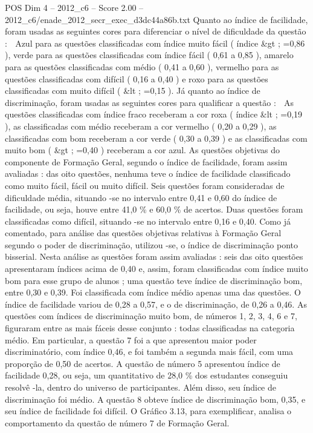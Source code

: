 \begin{textsample}{POS Dim 4 – 2012\_c6 – Score 2.00 – 2012\_c6/enade\_2012\_secr\_exec\_d3dc44a86b.txt}
Quanto ao índice de facilidade, foram usadas as seguintes cores para diferenciar o nível de dificuldade da questão :  Azul para as questões classificadas com índice muito fácil ( índice \&gt ; =0,86 ), verde para as questões classificadas com índice fácil ( 0,61 a 0,85 ), amarelo para as questões classificadas com médio ( 0,41 a 0,60 ), vermelho para as questões classificadas com difícil ( 0,16 a 0,40 ) e roxo para as questões classificadas com muito difícil ( \&lt ; =0,15 ).
Já quanto ao índice de discriminação, foram usadas as seguintes cores para qualificar a questão :  As questões classificadas com índice fraco receberam a cor roxa ( índice \&lt ; =0,19 ), as classificadas com médio receberam a cor vermelho ( 0,20 a 0,29 ), as classificadas com bom receberam a cor verde ( 0,30 a 0,39 ) e as classificadas com muito bom ( \&gt ; =0,40 ) receberam a cor azul.
As questões objetivas do componente de Formação Geral, segundo o índice de facilidade, foram assim avaliadas : das oito questões, nenhuma teve o índice de facilidade classificado como muito fácil, fácil ou muito difícil.
Seis questões foram consideradas de dificuldade média, situando -se no intervalo entre 0,41 e 0,60 do índice de facilidade, ou seja, houve entre 41,0 \% e 60,0 \% de acertos.
Duas questões foram classificadas como difícil, situando -se no intervalo entre 0,16 e 0,40.
Como já comentado, para análise das questões objetivas relativas à Formação Geral segundo o poder de discriminação, utilizou -se, o índice de discriminação ponto bisserial.
Nesta análise as questões foram assim avaliadas : seis das oito questões apresentaram índices acima de 0,40 e, assim, foram classificadas com índice muito bom para esse grupo de alunos ; uma questão teve índice de discriminação bom, entre 0,30 e 0,39.
Foi classificada com índice médio apenas uma das questões.
O índice de facilidade variou de 0,28 a 0,57, e o de discriminação, de 0,26 a 0,46.
As questões com índices de discriminação muito bom, de números 1, 2, 3, 4, 6 e 7, figuraram entre as mais fáceis desse conjunto : todas classificadas na categoria médio.
Em particular, a questão 7 foi a que apresentou maior poder discriminatório, com índice 0,46, e foi também a segunda mais fácil, com uma proporção de 0,50 de acertos.
A questão de número 5 apresentou índice de facilidade 0,28, ou seja, um quantitativo de 28,0 \% dos estudantes conseguiu resolvê -la, dentro do universo de participantes.
Além disso, seu índice de discriminação foi médio.
A questão 8 obteve índice de discriminação bom, 0,35, e seu índice de facilidade foi difícil.
O Gráfico 3.13, para exemplificar, analisa o comportamento da questão de número 7 de Formação Geral.

\end{textsample}
